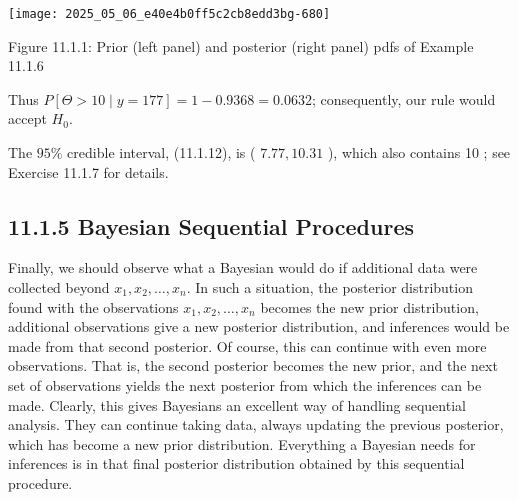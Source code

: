 \begin{center}
\texttt{[image: 2025\_05\_06\_e40e4b0ff5c2cb8edd3bg-680]}
\end{center}

Figure 11.1.1: Prior (left panel) and posterior (right panel) pdfs of Example 11.1.6

Thus $P[\Theta>10 \mid y=177]=1-0.9368=0.0632$; consequently, our rule would accept $H_{0}$.

The $95 \%$ credible interval, (11.1.12), is ( $7.77,10.31$ ), which also contains 10 ; see Exercise 11.1.7 for details.

\subsection*{11.1.5 Bayesian Sequential Procedures}
Finally, we should observe what a Bayesian would do if additional data were collected beyond $x_{1}, x_{2}, \ldots, x_{n}$. In such a situation, the posterior distribution found with the observations $x_{1}, x_{2}, \ldots, x_{n}$ becomes the new prior distribution, additional observations give a new posterior distribution, and inferences would be made from that second posterior. Of course, this can continue with even more observations. That is, the second posterior becomes the new prior, and the next set of observations yields the next posterior from which the inferences can be made. Clearly, this gives Bayesians an excellent way of handling sequential analysis. They can continue taking data, always updating the previous posterior, which has become a new prior distribution. Everything a Bayesian needs for inferences is in that final posterior distribution obtained by this sequential procedure.

